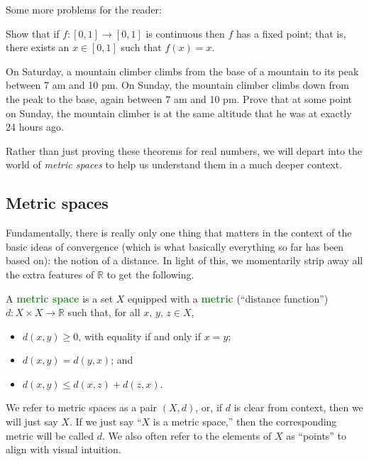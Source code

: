\documentclass[10pt]{scrartcl}
\providecommand{\RR}{\mathbb R}
\providecommand{\ii}{\item}
\providecommand{\vocab}[1]{{\textbf{\textcolor{ForestGreen}{#1}}}}
\begin{document}
Some more problems for the reader:
\begin{problem}
	Show that if $f\colon[0,1]\to[0,1]$ is continuous
	then $f$ has a fixed point;
	that is, there exists an $x\in[0,1]$ such that $f(x) = x$.
\end{problem}

\begin{problem}
	On Saturday, a mountain climber climbs from the base of a mountain
	to its peak between 7 am and 10 pm.
	On Sunday, the mountain climber climbs down from the peak to the base,
	again between 7 am and 10 pm.
	Prove that at some point on Sunday, the mountain climber
	is at the same altitude that he was at exactly 24 hours ago.
\end{problem}

Rather than just proving these theorems for real numbers,
we will depart into the world of \emph{metric spaces}
to help us understand them in a much deeper context.

\subsection{Metric spaces}
Fundamentally, there is really only one thing that matters
in the context of the basic ideas of convergence
(which is what basically everything so far has been based on):
the notion of a distance. In light of this,
we momentarily strip away all the extra features of $\RR$
to get the following.

\begin{definition}\label{wk7:def:metricspace}
	A \vocab{metric space} is a set $X$
	equipped with a \vocab{metric} (``distance function'')
	$d\colon X\times X\to \RR$ such that, for all $x,\,y,\,z\in X$,
	\begin{itemize}
		\ii $d(x,y)\ge 0$, with equality if and only if $x = y$;
		\ii $d(x, y) = d(y, x)$; and
		\ii $d(x, y) \le d(x, z) + d(z, x)$.
	\end{itemize}
	We refer to metric spaces as a pair $(X, d)$,
	or, if $d$ is clear from context, then we will just say $X$.
	If we just say ``$X$ is a metric space,''
	then the corresponding metric will be called $d$.
	We also often refer to the elements of $X$ as ``points''
	to align with visual intuition.
\end{definition}
\end{document}
